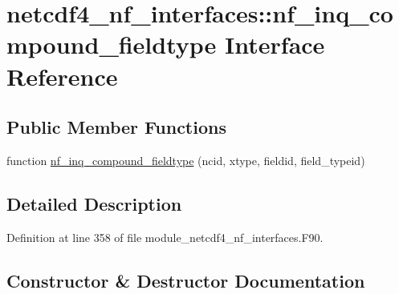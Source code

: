 \hypertarget{interfacenetcdf4__nf__interfaces_1_1nf__inq__compound__fieldtype}{}\section{netcdf4\+\_\+nf\+\_\+interfaces\+:\+:nf\+\_\+inq\+\_\+compound\+\_\+fieldtype Interface Reference}
\label{interfacenetcdf4__nf__interfaces_1_1nf__inq__compound__fieldtype}
\subsection*{Public Member Functions}
\begin{DoxyCompactItemize}
\item 
function \hyperlink{interfacenetcdf4__nf__interfaces_1_1nf__inq__compound__fieldtype_a409fa062354e72cc574e8af28b8580fc}{nf\+\_\+inq\+\_\+compound\+\_\+fieldtype} (ncid, xtype, fieldid, field\+\_\+typeid)
\end{DoxyCompactItemize}


\subsection{Detailed Description}


Definition at line 358 of file module\+\_\+netcdf4\+\_\+nf\+\_\+interfaces.\+F90.



\subsection{Constructor \& Destructor Documentation}
\mbox{\label{interfacenetcdf4__nf__interfaces_1_1nf__inq__compound__fieldtype_a409fa062354e72cc574e8af28b8580fc}} 
